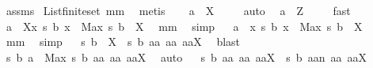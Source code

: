 \begin{isabellebody}
\ assms{\isacharparenleft}{}{\isacharparenright}\ \isanewline
List{\isachardot}finite{\isacharunderscore}set\ mm{}{}\ \isamarkupfalse%
\ metis\ \isamarkupfalse%
\ \isanewline
{}{\isacharcolon}\ {\isachardoublequoteopen}a\ {\isasymin}\ {\isacharquery}X{\isachardoublequoteclose}\ \isamarkupfalse%
\ {}\ \isamarkupfalse%
\ auto\ \isamarkupfalse%
\ {\isachardoublequoteopen}a\ {\isasymin}\ {\isacharquery}Z{\isachardoublequoteclose}\ \isamarkupfalse%
\ {}\ \isamarkupfalse%
\ fast\ \isanewline
{}\isamarkupfalse%
\ \isamarkupfalse%
\ {\isachardoublequoteopen}a\ {\isasymin}\ {\isacharquery}X{\isasyminter}{\isacharbraceleft}x{\isachardot}\ {\isacharquery}s\ b\ x\ {\isacharequal}\ Max\ {\isacharparenleft}{\isacharquery}s\ b\ {\isacharbackquote}\ {\isacharquery}X{\isacharparenright}{\isacharbraceright}{\isachardoublequoteclose}\ \isamarkupfalse%
\ mm{}{}\ \isamarkupfalse%
\ simp\isanewline
{}\isamarkupfalse%
\ \isamarkupfalse%
\ {\isachardoublequoteopen}a\ {\isasymin}\ {\isacharbraceleft}x{\isachardot}\ {\isacharquery}s\ b\ x\ {\isacharequal}\ Max\ {\isacharparenleft}{\isacharquery}s\ b\ {\isacharbackquote}\ {\isacharquery}X{\isacharparenright}{\isacharbraceright}{\isachardoublequoteclose}\ \isamarkupfalse%
\ mm{}{}\ \isamarkupfalse%
\ simp\isanewline
{}\isamarkupfalse%
\ \isamarkupfalse%
\ {\isachardoublequoteopen}{\isacharquery}s\ b\ {\isacharbackquote}\ {\isacharquery}X\ {\isacharequal}\ {\isacharbraceleft}{\isacharquery}s\ b\ aa{\isacharbar}\ aa{\isachardot}\ aa{\isasymin}{\isacharquery}X{\isacharbraceright}{\isachardoublequoteclose}\ \isamarkupfalse%
\ blast\isanewline
{}\isamarkupfalse%
\ \isamarkupfalse%
\ {\isachardoublequoteopen}{\isacharquery}s\ b\ a\ {\isacharequal}\ Max\ {\isacharbraceleft}{\isacharquery}s\ b\ aa{\isacharbar}\ aa{\isachardot}\ aa{\isasymin}{\isacharquery}X{\isacharbraceright}{\isachardoublequoteclose}\ \isamarkupfalse%
\ auto\isanewline
{}\isamarkupfalse%
\ \isamarkupfalse%
\ {\isachardoublequoteopen}{\isacharbraceleft}{\isacharquery}s\ b\ aa{\isacharbar}\ aa{\isachardot}\ aa{\isasymin}{\isacharquery}X{\isacharbraceright}\ {\isacharequal}\ {\isacharbraceleft}{\isacharquery}s\ b\ {\isacharparenleft}aa{\isacharminus}{\isacharminus}{\isacharquery}n{\isacharparenright}{\isacharbar}\ aa{\isachardot}\ aa{\isasymin}{\isacharquery}X{\isacharbraceright}{\isachardoublequoteclose}\ \isamarkupfalse%

\end{isabellebody}
